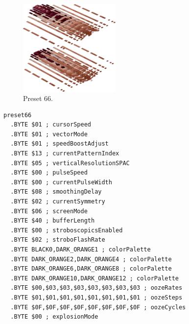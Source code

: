 \clearpage
\begin{minipage}[b]{0.48\linewidth}
\begin{figure}[H]                                                          
  \centering                                                             
  \begin{adjustbox}{width=5cm,center}                                   
  \includegraphics[width=5cm]{src/colorspace_presets/preset66-45.png}%
  \end{adjustbox}                                                        
\caption*{Preset 66.}                                           
\end{figure}                                                               
\end{minipage}
\hspace{0.1cm}
\begin{minipage}[b]{0.48\linewidth}                            
\begin{lstlisting}[basicstyle=\ttfamily\tiny]
preset66
  .BYTE $01 ; cursorSpeed
  .BYTE $01 ; vectorMode
  .BYTE $01 ; speedBoostAdjust
  .BYTE $13 ; currentPatternIndex
  .BYTE $05 ; verticalResolutionSPAC
  .BYTE $00 ; pulseSpeed
  .BYTE $00 ; currentPulseWidth
  .BYTE $08 ; smoothingDelay
  .BYTE $02 ; currentSymmetry
  .BYTE $06 ; screenMode
  .BYTE $40 ; bufferLength
  .BYTE $00 ; stroboscopicsEnabled
  .BYTE $02 ; stroboFlashRate
  .BYTE BLACK0,DARK_ORANGE1 ; colorPalette
  .BYTE DARK_ORANGE2,DARK_ORANGE4 ; colorPalette
  .BYTE DARK_ORANGE6,DARK_ORANGE8 ; colorPalette
  .BYTE DARK_ORANGE10,DARK_ORANGE12 ; colorPalette
  .BYTE $00,$03,$03,$03,$03,$03,$03,$03 ; oozeRates
  .BYTE $01,$01,$01,$01,$01,$01,$01,$01 ; oozeSteps
  .BYTE $0F,$0F,$0F,$0F,$0F,$0F,$0F,$0F ; oozeCycles
  .BYTE $00 ; explosionMode
\end{lstlisting}
\end{minipage}

\vspace*{-0.5cm}

